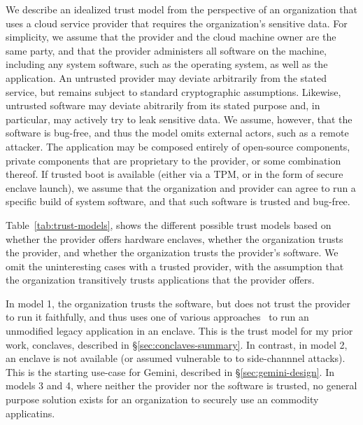 We describe an idealized trust model from the perspective of an
organization that uses a cloud service provider that requires the organization's
sensitive data.
%
For simplicity, we assume that the provider and the cloud machine owner are the
same party, and that the provider administers all software on the machine,
including any system software, such as the operating system, as well as the
application.
%
An untrusted provider may deviate arbitrarily from the stated service, but
remains subject to standard cryptographic assumptions.
%
Likewise, untrusted software may deviate abitrarily from its stated purpose
and, in particular, may actively try to leak sensitive data.
%
We assume, however, that the software is bug-free, and thus the model omits
external actors, such as a remote attacker.
%
The application may be composed entirely of open-source components, private
components that are proprietary to the provider, or some combination thereof.
%
If trusted boot is available  (either via a TPM, or in the form of secure
enclave launch), we assume that the organization and provider can agree to run
a specific build of system software, and that such software is trusted and
bug-free.


Table~\ref{tab:trust-models}, shows the different possible trust models based
on whether the provider offers hardware enclaves, whether the organization
trusts the provider, and whether the organization trusts the provider's
software.
%
We omit the uninteresting cases with a trusted provider, with the assumption
that the organization transitively trusts applications that the provider
offers.


In model 1, the organization trusts the software, but does not trust the
provider to run it faithfully, and thus uses one of various
approaches~\cite{talos,haven,scone,graphene} to
run an unmodified legacy application in an enclave.
%
This is the trust model for my prior work, conclaves, described in
\S\ref{sec:conclaves-summary}.
%
In contrast, in model 2, an enclave is not available (or assumed vulnerable to
to side-channnel attacks).
%
This is the starting use-case for Gemini, described in \S\ref{sec:gemini-design}.
%
In models 3 and 4, where neither the provider nor the software is trusted, no
general purpose solution exists for an organization to securely use an
commodity applicatins.



